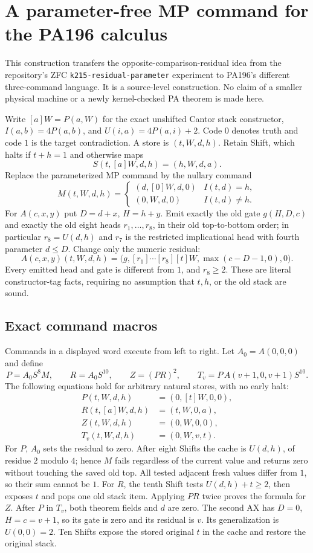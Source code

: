 \section{A parameter-free MP command for the PA196 calculus}
\label{sec:residual-pa}

This construction transfers the opposite-comparison-residual idea from the
repository's ZFC \texttt{k215-residual-parameter} experiment to PA196's
different three-command language. It is a source-level construction. No
claim of a smaller physical machine or a newly kernel-checked PA theorem is
made here.

Write $[a]W=P(a,W)$ for the exact unshifted Cantor stack constructor,
$I(a,b)=4P(a,b)$, and $U(i,a)=4P(a,i)+2$. Code $0$ denotes truth and code
$1$ is the target contradiction. A store is $(t,W,d,h)$. Retain Shift,
which halts if $t+h=1$ and otherwise maps
\[
 S(t,[a]W,d,h)=(h,W,d,a).
\]
Replace the parameterized MP command by the nullary command
\[
 M(t,W,d,h)=
 \begin{cases}(d,[0]W,d,0)& I(t,d)=h,\\(0,W,d,0)&I(t,d)\ne h.
 \end{cases}
\]
For $A(c,x,y)$ put $D=d+x$, $H=h+y$. Emit exactly the old gate
$g(H,D,c)$ and exactly the old eight heads $r_1,\ldots,r_8$, in their
old top-to-bottom order; in particular $r_8=U(d,h)$ and $r_7$ is the
restricted implicational head with fourth parameter $d\le D$.
Change only the numeric residual:
\[
 A(c,x,y)(t,W,d,h)=
 \bigl(g,[r_1]\cdots[r_8][t]W,\max(c-D-1,0),0\bigr).
\]
Every emitted head and gate is different from $1$, and $r_8\ge2$.
These are literal constructor-tag facts, requiring no assumption that
$t,h$, or the old stack are sound.

\subsection{Exact command macros}

Commands in a displayed word execute from left to right. Let $A_0=A(0,0,0)$
and define
\[
 P=A_0S^8M,\qquad R=A_0S^{10},\qquad
 Z=(PR)^2,\qquad
 T_v=P\,A(v+1,0,v+1)S^{10}.
\]
The following equations hold for arbitrary natural stores, with no early
halt:
\begin{align*}
 P(t,W,d,h)&=(0,[t]W,0,0),\\
 R(t,[a]W,d,h)&=(t,W,0,a),\\
 Z(t,W,d,h)&=(0,W,0,0),\\
 T_v(t,W,d,h)&=(0,W,v,t).
\end{align*}
For $P$, $A_0$ sets the residual to zero. After eight Shifts the cache is
$U(d,h)$, of residue $2$ modulo $4$; hence $M$ fails regardless of the
current value and returns zero without touching the saved old top.
All tested adjacent fresh values differ from $1$, so their sum cannot be
$1$. For $R$, the tenth Shift tests $U(d,h)+t\ge2$, then exposes $t$ and
pops one old stack item. Applying $PR$ twice proves the formula for $Z$.
After $P$ in $T_v$, both theorem fields and $d$ are zero. The second AX
has $D=0$, $H=c=v+1$, so its gate is zero and its residual is $v$. Its
generalization is $U(0,0)=2$. Ten Shifts expose the stored original $t$
in the cache and restore the original stack.

